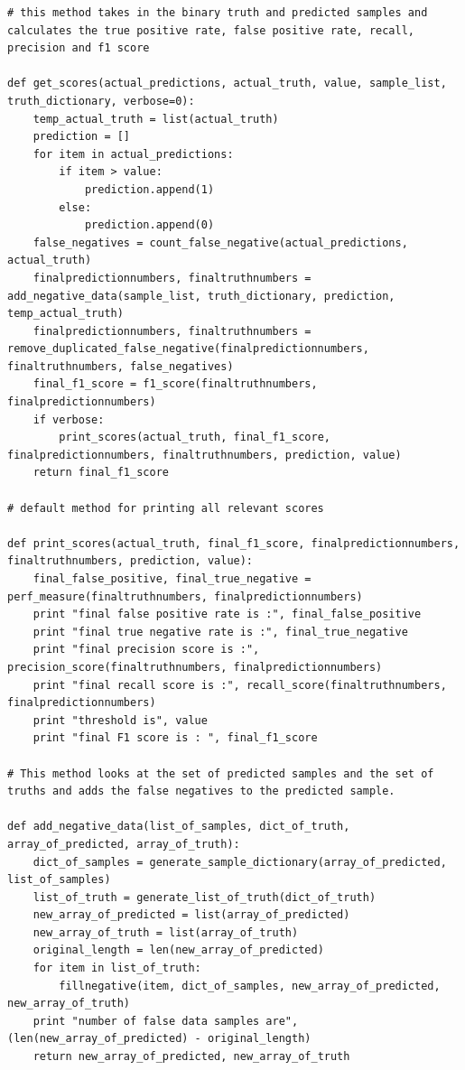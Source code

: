 \documentclass{article}
\begin{document}
\begin{verbatim}
# this method takes in the binary truth and predicted samples and calculates the true positive rate, false positive rate, recall, precision and f1 score
	
def get_scores(actual_predictions, actual_truth, value, sample_list, truth_dictionary, verbose=0):
    temp_actual_truth = list(actual_truth)
    prediction = []
    for item in actual_predictions:
        if item > value:
            prediction.append(1)
        else:
            prediction.append(0)
    false_negatives = count_false_negative(actual_predictions, actual_truth)
    finalpredictionnumbers, finaltruthnumbers = add_negative_data(sample_list, truth_dictionary, prediction, temp_actual_truth)
    finalpredictionnumbers, finaltruthnumbers = remove_duplicated_false_negative(finalpredictionnumbers, finaltruthnumbers, false_negatives)
    final_f1_score = f1_score(finaltruthnumbers, finalpredictionnumbers)
    if verbose:
        print_scores(actual_truth, final_f1_score, finalpredictionnumbers, finaltruthnumbers, prediction, value)
    return final_f1_score

# default method for printing all relevant scores
	
def print_scores(actual_truth, final_f1_score, finalpredictionnumbers, finaltruthnumbers, prediction, value):
    final_false_positive, final_true_negative = perf_measure(finaltruthnumbers, finalpredictionnumbers)
    print "final false positive rate is :", final_false_positive
    print "final true negative rate is :", final_true_negative
    print "final precision score is :", precision_score(finaltruthnumbers, finalpredictionnumbers)
    print "final recall score is :", recall_score(finaltruthnumbers, finalpredictionnumbers)
    print "threshold is", value
    print "final F1 score is : ", final_f1_score

# This method looks at the set of predicted samples and the set of truths and adds the false negatives to the predicted sample.
	
def add_negative_data(list_of_samples, dict_of_truth, array_of_predicted, array_of_truth):
    dict_of_samples = generate_sample_dictionary(array_of_predicted, list_of_samples)
    list_of_truth = generate_list_of_truth(dict_of_truth)
    new_array_of_predicted = list(array_of_predicted)
    new_array_of_truth = list(array_of_truth)
    original_length = len(new_array_of_predicted)
    for item in list_of_truth:
        fillnegative(item, dict_of_samples, new_array_of_predicted, new_array_of_truth)
    print "number of false data samples are", (len(new_array_of_predicted) - original_length)
    return new_array_of_predicted, new_array_of_truth


\end{verbatim}
\end{document}
